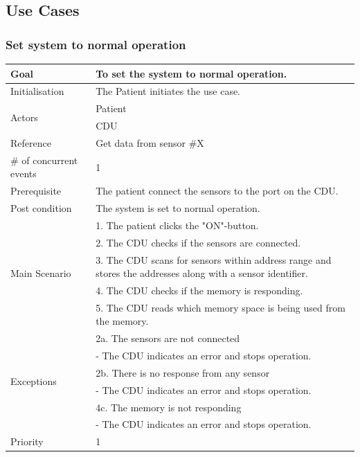 \subsection{Use Cases}

\subsubsection{Set system to normal operation}

\begin{table}[H]
	\centering
	\begin{tabular}{|l|p{10cm}|}
	\hline
	Goal 							& To set the system to normal operation. \\ \hline
	Initialisation 					& The Patient initiates the use case. \\ \hline
	\multirow{2}{*}{Actors} 		& Patient \\ 
									& CDU \\ \hline
	Reference 						& Get data from sensor \#X \\ \hline
	\# of concurrent events 		& 1 \\ \hline
	Prerequisite  					& The patient connect the sensors to the port on the CDU. \\ \hline
	Post condition 					& The system is set to normal operation. \\ \hline
	\multirow{5}{*}{Main Scenario} 	& 1. The patient clicks the  "ON"-button. \\
	& 2. The CDU checks if the sensors are connected.\\
	& 3. The CDU scans for sensors within address range and  stores the addresses along with a sensor identifier.\\ 
	& 4. The CDU checks if the memory is responding.\\
	& 5. The CDU reads which memory space is being used from the memory.\\ \hline
	\multirow{6}{*}{Exceptions} & 2a. The sensors are not connected \\ 
								& - The CDU indicates an error and stops operation.\\											& 2b. There is no response from any sensor\\
								& - The CDU indicates an error and stops operation. \\
								& 4c. The memory is not responding\\
								& - The CDU indicates an error and stops operation. \\ 
								\hline
	Priority					& 1\\\hline
	\end{tabular}
\end{table}


